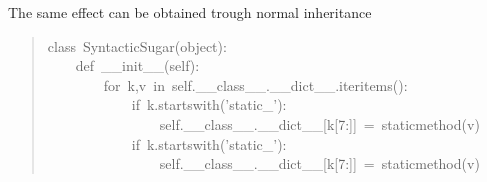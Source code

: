 \documentclass[10pt,english]{article}
\begin{document}
The same effect can be obtained trough normal inheritance
\begin{quote}
\begin{ttfamily}\begin{flushleft}
\mbox{class~SyntacticSugar(object):}\\
\mbox{~~~~def~{\_}{\_}init{\_}{\_}(self):}\\
\mbox{~~~~~~~~for~k,v~in~self.{\_}{\_}class{\_}{\_}.{\_}{\_}dict{\_}{\_}.iteritems():}\\
\mbox{~~~~~~~~~~~~if~k.startswith('static{\_}'):}\\
\mbox{~~~~~~~~~~~~~~~~self.{\_}{\_}class{\_}{\_}.{\_}{\_}dict{\_}{\_}[k[7:]]~=~staticmethod(v)}\\
\mbox{~~~~~~~~~~~~if~k.startswith('static{\_}'):}\\
\mbox{~~~~~~~~~~~~~~~~self.{\_}{\_}class{\_}{\_}.{\_}{\_}dict{\_}{\_}[k[7:]]~=~staticmethod(v)}
\end{flushleft}\end{ttfamily}
\end{quote}
\end{document}
